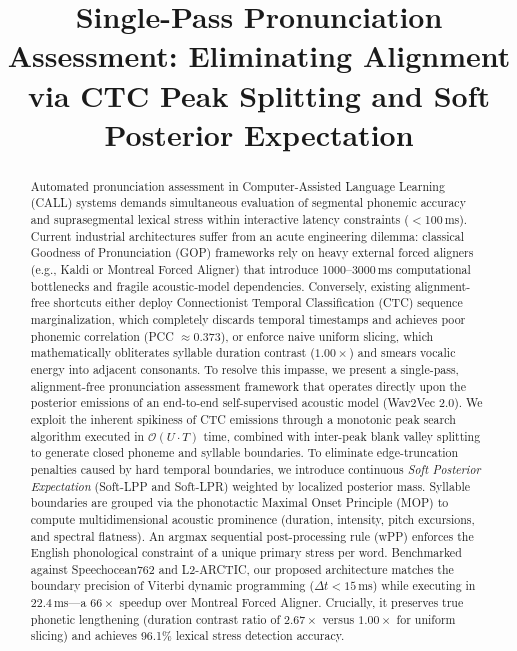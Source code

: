 \documentclass[10pt,conference]{IEEEtran}
\begin{document}
\title{Single-Pass Pronunciation Assessment: Eliminating Alignment via CTC Peak Splitting and Soft Posterior Expectation}

\author{
}

\maketitle

\begin{abstract}
Automated pronunciation assessment in Computer-Assisted Language Learning (CALL) systems demands simultaneous evaluation of segmental phonemic accuracy and suprasegmental lexical stress within interactive latency constraints ($<$100\,ms). Current industrial architectures suffer from an acute engineering dilemma: classical Goodness of Pronunciation (GOP) frameworks rely on heavy external forced aligners (e.g., Kaldi or Montreal Forced Aligner) that introduce 1000--3000\,ms computational bottlenecks and fragile acoustic-model dependencies. Conversely, existing alignment-free shortcuts either deploy Connectionist Temporal Classification (CTC) sequence marginalization, which completely discards temporal timestamps and achieves poor phonemic correlation (PCC $\approx 0.373$), or enforce naive uniform slicing, which mathematically obliterates syllable duration contrast ($1.00\times$) and smears vocalic energy into adjacent consonants. 
To resolve this impasse, we present a single-pass, alignment-free pronunciation assessment framework that operates directly upon the posterior emissions of an end-to-end self-supervised acoustic model (Wav2Vec 2.0). We exploit the inherent spikiness of CTC emissions through a monotonic peak search algorithm executed in $\mathcal{O}(U \cdot T)$ time, combined with inter-peak blank valley splitting to generate closed phoneme and syllable boundaries. To eliminate edge-truncation penalties caused by hard temporal boundaries, we introduce continuous \textit{Soft Posterior Expectation} (Soft-LPP and Soft-LPR) weighted by localized posterior mass. Syllable boundaries are grouped via the phonotactic Maximal Onset Principle (MOP) to compute multidimensional acoustic prominence (duration, intensity, pitch excursions, and spectral flatness). An argmax sequential post-processing rule (wPP) enforces the English phonological constraint of a unique primary stress per word. Benchmarked against Speechocean762 and L2-ARCTIC, our proposed architecture matches the boundary precision of Viterbi dynamic programming ($\Delta t < 15$\,ms) while executing in 22.4\,ms---a $66\times$ speedup over Montreal Forced Aligner. Crucially, it preserves true phonetic lengthening (duration contrast ratio of $2.67\times$ versus $1.00\times$ for uniform slicing) and achieves 96.1\% lexical stress detection accuracy.
\end{abstract}
\end{document}
